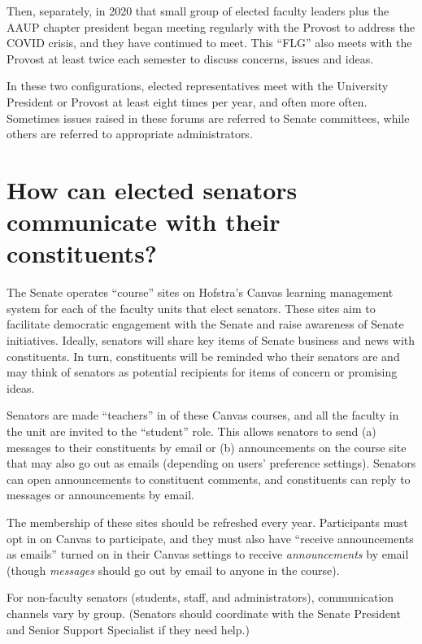 \documentclass[12pt]{article}
\begin{document}
Then, separately, in 2020 that small group of elected faculty leaders
plus the AAUP chapter president began meeting regularly with the Provost
to address the COVID crisis, and they have continued to meet. This
``FLG'' also meets with the Provost at least twice each semester to
discuss concerns, issues and ideas.

In these two configurations, elected representatives meet with the
University President or Provost at least eight times per year, and often
more often. Sometimes issues raised in these forums are referred to
Senate committees, while others are referred to appropriate
administrators.

\section{How can elected senators communicate with their
constituents?}\label{how-can-elected-senators-communicate-with-their-constituents}

The Senate operates ``course'' sites on Hofstra's Canvas learning
management system for each of the faculty units that elect senators.
These sites aim to facilitate democratic engagement with the Senate and
raise awareness of Senate initiatives. Ideally, senators will share key
items of Senate business and news with constituents. In turn,
constituents will be reminded who their senators are and may think of
senators as potential recipients for items of concern or promising
ideas.

Senators are made ``teachers'' in of these Canvas courses, and all the
faculty in the unit are invited to the ``student'' role. This allows
senators to send (a) messages to their constituents by email or (b)
announcements on the course site that may also go out as emails
(depending on users' preference settings). Senators can open
announcements to constituent comments, and constituents can reply to
messages or announcements by email.

The membership of these sites should be refreshed every year.
Participants must opt in on Canvas to participate, and they must also
have ``receive announcements as emails'' turned on in their Canvas
settings to receive \emph{announcements} by email (though \emph{messages} should
go out by email to anyone in the course).

For non-faculty senators (students, staff, and administrators),
communication channels vary by group. (Senators should coordinate with
the Senate President and Senior Support Specialist if they need help.)
\end{document}
